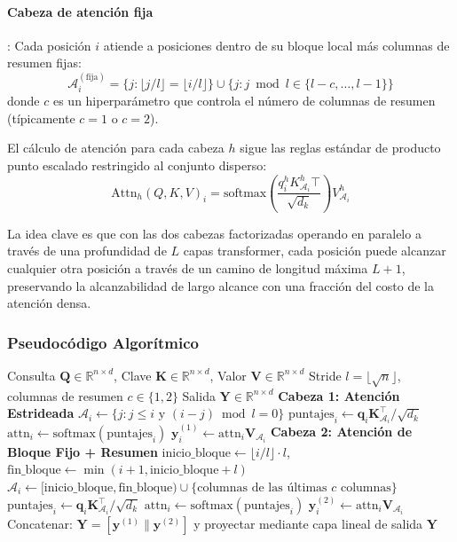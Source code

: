 \paragraph{Cabeza de atención fija}: Cada posición $i$ atiende a posiciones dentro de su bloque local más columnas de resumen fijas:
\[
\mathcal{A}_i^{(\text{fija})} = \{j : \lfloor j/l \rfloor = \lfloor i/l \rfloor\} \cup \{j : j \bmod l \in \{l-c, \ldots, l-1\}\}
\]
donde $c$ es un hiperparámetro que controla el número de columnas de resumen (típicamente $c=1$ o $c=2$).

El cálculo de atención para cada cabeza $h$ sigue las reglas estándar de producto punto escalado restringido al conjunto disperso:
\[
\text{Attn}_h(Q, K, V)_i = \text{softmax}\left(\frac{q_i^h K_{\mathcal{A}_i}^h\top}{\sqrt{d_k}}\right) V_{\mathcal{A}_i}^h
\]

La idea clave es que con las dos cabezas factorizadas operando en paralelo a través de una profundidad de $L$ capas transformer, cada posición puede alcanzar cualquier otra posición a través de un camino de longitud máxima $L + 1$, preservando la alcanzabilidad de largo alcance con una fracción del costo de la atención densa.

\subsubsection{Pseudocódigo Algorítmico}

\begin{algorithm}[H]
\caption{Atención Sparse Transformer: Cabezas Duales Estrideada + Fija}
\begin{algorithmic}[1]
\Require Consulta $\mathbf{Q} \in \mathbb{R}^{n \times d}$, Clave $\mathbf{K} \in \mathbb{R}^{n \times d}$, Valor $\mathbf{V} \in \mathbb{R}^{n \times d}$
\Require Stride $l = \lfloor\sqrt{n}\rfloor$, columnas de resumen $c \in \{1, 2\}$
\Ensure Salida $\mathbf{Y} \in \mathbb{R}^{n \times d}$
\State \textbf{Cabeza 1: Atención Estrideada}
    \State $\mathcal{A}_i \gets \{j : j \leq i \text{ y } (i-j) \bmod l = 0\}$ 
    \State $\text{puntajes}_{i} \gets \mathbf{q}_i \mathbf{K}_{\mathcal{A}_i}^\top / \sqrt{d_k}$
    \State $\text{attn}_{i} \gets \text{softmax}(\text{puntajes}_{i})$
    \State $\mathbf{y}_i^{(1)} \gets \text{attn}_{i} \mathbf{V}_{\mathcal{A}_i}$
\EndFor
\State \textbf{Cabeza 2: Atención de Bloque Fijo + Resumen}
    \State $\text{inicio\_bloque} \gets \lfloor i/l \rfloor \cdot l$, $\text{fin\_bloque} \gets \min(i+1, \text{inicio\_bloque}+l)$
    \State $\mathcal{A}_i \gets [\text{inicio\_bloque}, \text{fin\_bloque}) \cup \{\text{columnas de las últimas } c \text{ columnas}\}$
    \State $\text{puntajes}_{i} \gets \mathbf{q}_i \mathbf{K}_{\mathcal{A}_i}^\top / \sqrt{d_k}$
    \State $\text{attn}_{i} \gets \text{softmax}(\text{puntajes}_{i})$
    \State $\mathbf{y}_i^{(2)} \gets \text{attn}_{i} \mathbf{V}_{\mathcal{A}_i}$
\EndFor
\State Concatenar: $\mathbf{Y} = [\mathbf{y}^{(1)} \| \mathbf{y}^{(2)}]$ y proyectar mediante capa lineal de salida
\Return $\mathbf{Y}$
\end{algorithmic}
\end{algorithm}

